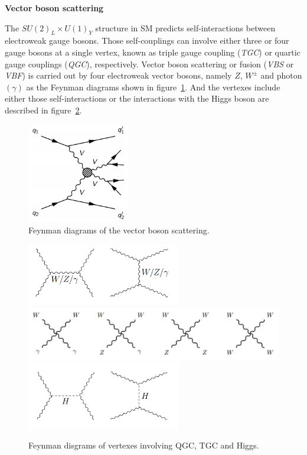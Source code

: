 \textbf{Vector boson scattering}

The $SU(2)_{L} \times U(1)_{Y}$ structure in SM predicts self-interactions between electroweak gauge bosons.
Those self-couplings can involve either three or four gauge bosons at a single vertex, known as triple gauge coupling (\textit{TGC}) or
quartic gauge couplings (\textit{QGC}), respectively.
Vector boson scattering or fusion (\textit{VBS} or \textit{VBF}) is carried out 
by four electroweak vector bosons, namely $Z$, $W^{\pm}$ and photon $(\gamma)$ as the Feynman diagrams shown in figure~\ref{fig:vbs_fd1}. 
And the vertexes include either those self-interactions
or the interactions with the Higgs boson are described in figure~\ref{fig:vbs_fd2}.
\begin{figure}[!htb]
  \centering
  \includegraphics[width=0.4\textwidth]{figures/Theory/VBS.png} 
  \caption{Feynman diagrams of the vector boson scattering.}
  \label{fig:vbs_fd1}
\end{figure}
\begin{figure}[!htb]
  \centering
  \includegraphics[width=0.6\textwidth]{figures/Theory/vbs_tgc.png} \\
  \includegraphics[width=1.0\textwidth]{figures/Theory/vbs_qgc.png} \\
  \includegraphics[width=0.6\textwidth]{figures/Theory/vbs_higgs.png} 
  \caption{Feynman disgrams of vertexes involving QGC, TGC and Higgs.}
  \label{fig:vbs_fd2}
\end{figure}

